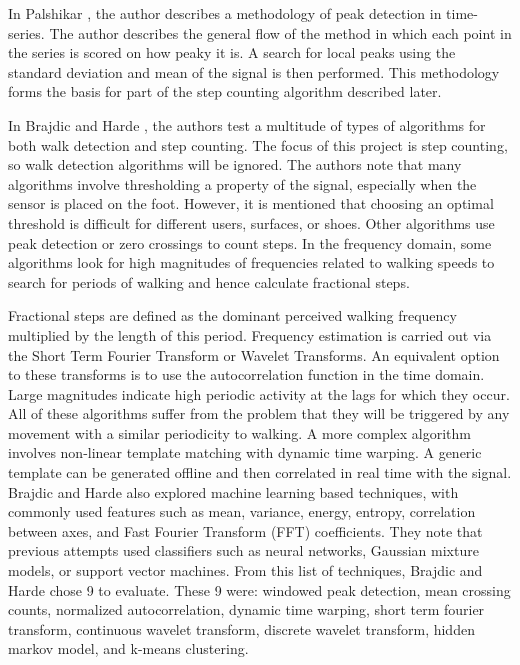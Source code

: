                 In Palshikar \cite{palshikar}, the author describes a methodology of peak detection in time-series. The author describes the general flow of the method in which each point in the series is scored on how peaky it is. A search for local peaks using the standard deviation and mean of the signal is then performed. This methodology forms the basis for part of the step counting algorithm described later.

                In Brajdic and Harde \cite{brajdic}, the authors test a multitude of types of algorithms for both walk detection and step counting. The focus of this project is step counting, so walk detection algorithms will be ignored. The authors note that many algorithms involve thresholding a property of the signal, especially when the sensor is placed on the foot. However, it is mentioned that choosing an optimal threshold is difficult for different users, surfaces, or shoes. Other algorithms use peak detection or zero crossings to count steps. In the frequency domain, some algorithms look for high magnitudes of frequencies related to walking speeds to search for periods of walking and hence calculate fractional steps. 

                Fractional steps are defined as the dominant perceived walking frequency multiplied by the length of this period. Frequency estimation is carried out via the Short Term Fourier Transform or Wavelet Transforms. An equivalent option to these transforms is to use the autocorrelation function in the time domain. Large magnitudes indicate high periodic activity at the lags for which they occur. All of these algorithms suffer from the problem that they will be triggered by any movement with a similar periodicity to walking. A more complex algorithm involves non-linear template matching with dynamic time warping. A generic template can be generated offline and then correlated in real time with the signal. Brajdic and Harde \cite{brajdic} also explored machine learning based techniques, with commonly used features such as mean, variance, energy, entropy, correlation between axes, and Fast Fourier Transform (FFT) coefficients. They note that previous attempts used classifiers such as neural networks, Gaussian mixture models, or support vector machines. From this list of techniques, Brajdic and Harde \cite{brajdic} chose 9 to evaluate. These 9 were: windowed peak detection, mean crossing counts, normalized autocorrelation, dynamic time warping, short term fourier transform, continuous wavelet transform, discrete wavelet transform, hidden markov model, and k-means clustering. 

